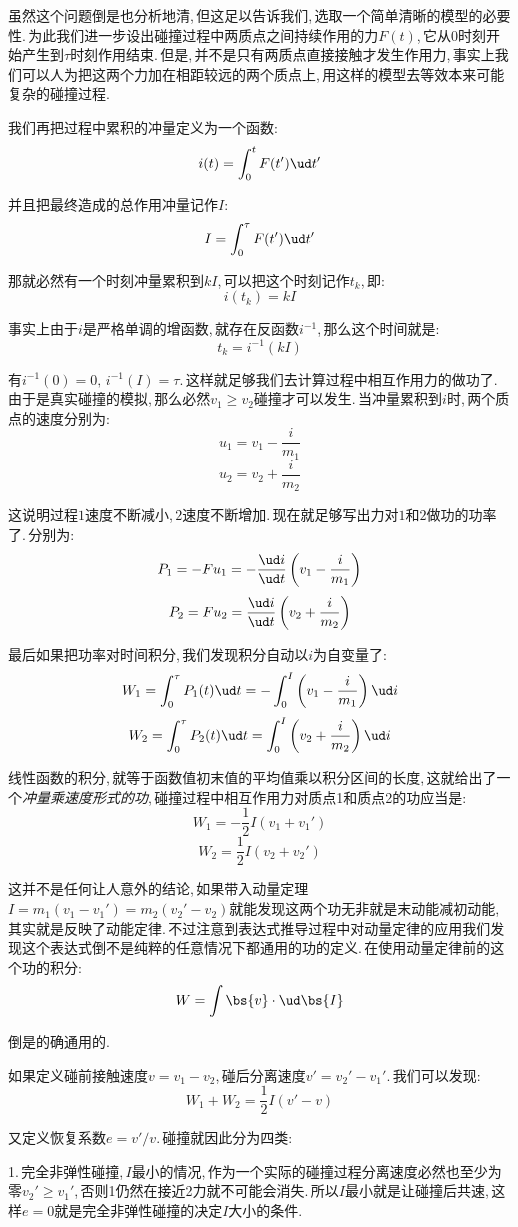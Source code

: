 虽然这个问题倒是也分析地清,\,但这足以告诉我们,\,选取一个简单清晰的模型的必要性.\,为此我们进一步设出碰撞过程中两质点之间持续作用的力$F(t)$,\,它从$0$时刻开始产生到$\tau$时刻作用结束.\,但是,\,并不是只有两质点直接接触才发生作用力,\,事实上我们可以人为把这两个力加在相距较远的两个质点上,\,用这样的模型去等效本来可能复杂的碰撞过程.

我们再把过程中累积的冲量定义为一个函数:
\[i(t)=\int_0^t F(t')\ud t'\]

并且把最终造成的总作用冲量记作$I$:
\[I=\int_0^\tau F(t')\ud t'\]

那就必然有一个时刻冲量累积到$kI$,\,可以把这个时刻记作$t_k$,\,即:
\[i(t_k)=kI\]

事实上由于$i$是严格单调的增函数,\,就存在反函数$i^{-1}$,\,那么这个时间就是:
\[t_k=i^{-1}(kI)\]

有$i^{-1}(0)=0,\,i^{-1}(I)=\tau$.\,这样就足够我们去计算过程中相互作用力的做功了.\,由于是真实碰撞的模拟,\,那么必然$v_1\geq v_2$碰撞才可以发生.\,当冲量累积到$i$时,\,两个质点的速度分别为:
\[u_1=v_1-\frac{i}{m_1}\]
\[u_2=v_2+\frac{i}{m_2}\]

这说明过程$1$速度不断减小,\,$2$速度不断增加.\,现在就足够写出力对$1$和$2$做功的功率了.\,分别为:
\[P_1=-Fu_1=-\frac{\ud i}{\ud t}\left(v_1-\frac{i
}{m_1}\right)\]
\[P_2=Fu_2=\frac{\ud i}{\ud t}\left(v_2+\frac{i
}{m_2}\right)\]

最后如果把功率对时间积分,\,我们发现积分自动以$i$为自变量了:
\[W_1=\int_0^\tau P_1(t)\ud t=-\int_0^I \left(v_1-\frac{i
}{m_1}\right)\ud i\]
\[W_2=\int_0^\tau P_2(t)\ud t=\int_0^I \left(v_2+\frac{i
}{m_2}\right)\ud i\]

线性函数的积分,\,就等于函数值初末值的平均值乘以积分区间的长度,\,这就给出了一个\emph{冲量乘速度形式的功},\,碰撞过程中相互作用力对质点1和质点2的功应当是:
\[W_1=-\frac{1}{2}I(v_1+v_1')\]
\[W_2=\frac{1}{2}I(v_2+v_2')\]

这并不是任何让人意外的结论,\,如果带入动量定理$I=m_1(v_1-v_1')=m_2(v_2'-v_2)$就能发现这两个功无非就是末动能减初动能,\,其实就是反映了动能定律.\,不过注意到表达式推导过程中对动量定律的应用我们发现这个表达式倒不是纯粹的任意情况下都通用的功的定义.\,在使用动量定律前的这个功的积分:
\[W=\int \bs{v}\cdot \ud \bs{I}\]

倒是的确通用的.

如果定义碰前接触速度$v=v_1-v_2$,\,碰后分离速度$v'=v_2'-v_1'$.\,我们可以发现:
\[W_1+W_2=\frac{1}{2}I(v'-v)\]

又定义恢复系数$e=v'/v$.\,碰撞就因此分为四类:

1.\,完全非弹性碰撞,\,$I$最小的情况,\,作为一个实际的碰撞过程分离速度必然也至少为零$v_2'\geq v_1'$,\,否则1仍然在接近2力就不可能会消失.\,所以$I$最小就是让碰撞后共速,\,这样$e=0$就是完全非弹性碰撞的决定$I$大小的条件.

